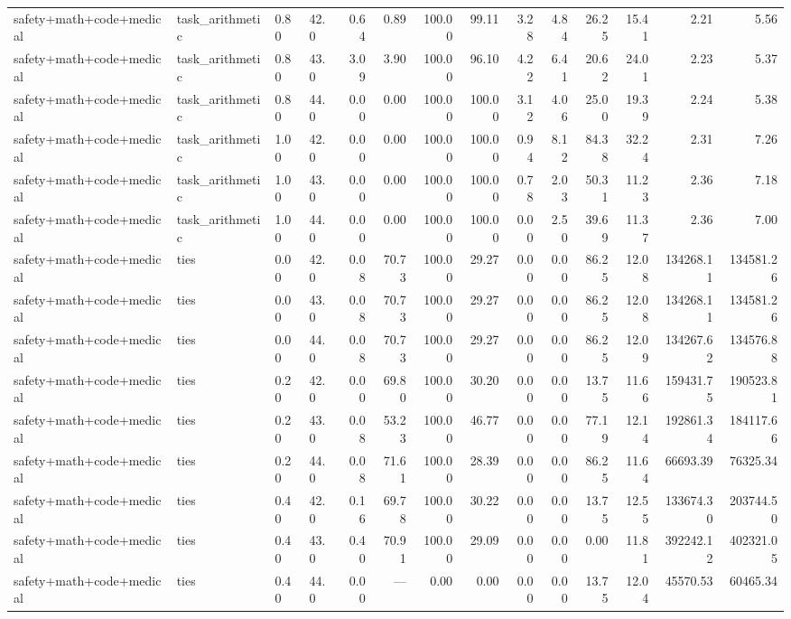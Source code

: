 \documentclass{article}
\begin{document}
\begin{table}[H]
{\begin{tabular}{llllrrrrrrrrrr}
safety+math+code+medical & task\_arithmetic & 0.80 & 42.0 & 0.64 & 0.89 & 100.00 & 99.11 & 3.28 & 4.84 & 26.25 & 15.41 & 2.21 & 5.56 \\
safety+math+code+medical & task\_arithmetic & 0.80 & 43.0 & 3.09 & 3.90 & 100.00 & 96.10 & 4.22 & 6.41 & 20.62 & 24.01 & 2.23 & 5.37 \\
safety+math+code+medical & task\_arithmetic & 0.80 & 44.0 & 0.00 & 0.00 & 100.00 & 100.00 & 3.12 & 4.06 & 25.00 & 19.39 & 2.24 & 5.38 \\
safety+math+code+medical & task\_arithmetic & 1.00 & 42.0 & 0.00 & 0.00 & 100.00 & 100.00 & 0.94 & 8.12 & 84.38 & 32.24 & 2.31 & 7.26 \\
safety+math+code+medical & task\_arithmetic & 1.00 & 43.0 & 0.00 & 0.00 & 100.00 & 100.00 & 0.78 & 2.03 & 50.31 & 11.23 & 2.36 & 7.18 \\
safety+math+code+medical & task\_arithmetic & 1.00 & 44.0 & 0.00 & 0.00 & 100.00 & 100.00 & 0.00 & 2.50 & 39.69 & 11.37 & 2.36 & 7.00 \\
safety+math+code+medical & ties & 0.00 & 42.0 & 0.08 & 70.73 & 100.00 & 29.27 & 0.00 & 0.00 & 86.25 & 12.08 & 134268.11 & 134581.26 \\
safety+math+code+medical & ties & 0.00 & 43.0 & 0.08 & 70.73 & 100.00 & 29.27 & 0.00 & 0.00 & 86.25 & 12.08 & 134268.11 & 134581.26 \\
safety+math+code+medical & ties & 0.00 & 44.0 & 0.08 & 70.73 & 100.00 & 29.27 & 0.00 & 0.00 & 86.25 & 12.09 & 134267.62 & 134576.88 \\
safety+math+code+medical & ties & 0.20 & 42.0 & 0.00 & 69.80 & 100.00 & 30.20 & 0.00 & 0.00 & 13.75 & 11.66 & 159431.75 & 190523.81 \\
safety+math+code+medical & ties & 0.20 & 43.0 & 0.08 & 53.23 & 100.00 & 46.77 & 0.00 & 0.00 & 77.19 & 12.14 & 192861.34 & 184117.66 \\
safety+math+code+medical & ties & 0.20 & 44.0 & 0.08 & 71.61 & 100.00 & 28.39 & 0.00 & 0.00 & 86.25 & 11.64 & 66693.39 & 76325.34 \\
safety+math+code+medical & ties & 0.40 & 42.0 & 0.16 & 69.78 & 100.00 & 30.22 & 0.00 & 0.00 & 13.75 & 12.55 & 133674.30 & 203744.50 \\
safety+math+code+medical & ties & 0.40 & 43.0 & 0.40 & 70.91 & 100.00 & 29.09 & 0.00 & 0.00 & 0.00 & 11.81 & 392242.12 & 402321.05 \\
safety+math+code+medical & ties & 0.40 & 44.0 & 0.00 & --- & 0.00 & 0.00 & 0.00 & 0.00 & 13.75 & 12.04 & 45570.53 & 60465.34 \\

\end{tabular}}
\end{table}
\end{document}
